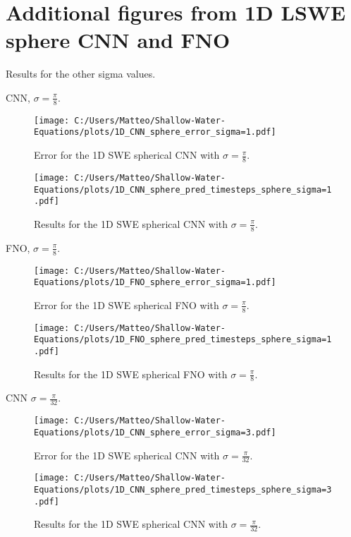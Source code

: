 \section{Additional figures from 1D LSWE sphere CNN and FNO}\label{app:1D_SWE_spherical_CNN_FNO}
Results for the other sigma values.


CNN, $\sigma = \frac{\pi}{8}$.
\begin{figure}[H]
    \centering
    \texttt{[image: C:/Users/Matteo/Shallow-Water-Equations/plots/1D\_CNN\_sphere\_error\_sigma=1.pdf]}
    \caption{Error for the 1D SWE spherical CNN with $\sigma = \frac{\pi}{8}$.}
\end{figure}

\begin{figure}[H]
    \centering
    \texttt{[image: C:/Users/Matteo/Shallow-Water-Equations/plots/1D\_CNN\_sphere\_pred\_timesteps\_sphere\_sigma=1.pdf]}
    \caption{Results for the 1D SWE spherical CNN with $\sigma = \frac{\pi}{8}$.}
\end{figure}

FNO, $\sigma = \frac{\pi}{8}$.
\begin{figure}[H]
    \centering
    \texttt{[image: C:/Users/Matteo/Shallow-Water-Equations/plots/1D\_FNO\_sphere\_error\_sigma=1.pdf]}
    \caption{Error for the 1D SWE spherical FNO with $\sigma = \frac{\pi}{8}$.}
\end{figure}

\begin{figure}[H]
    \centering
    \texttt{[image: C:/Users/Matteo/Shallow-Water-Equations/plots/1D\_FNO\_sphere\_pred\_timesteps\_sphere\_sigma=1.pdf]}
    \caption{Results for the 1D SWE spherical FNO with $\sigma = \frac{\pi}{8}$.}
\end{figure}

CNN $\sigma = \frac{\pi}{32}$.
\begin{figure}[H]
    \centering
    \texttt{[image: C:/Users/Matteo/Shallow-Water-Equations/plots/1D\_CNN\_sphere\_error\_sigma=3.pdf]}
    \caption{Error for the 1D SWE spherical CNN with $\sigma = \frac{\pi}{32}$.}
\end{figure}

\begin{figure}[H]
    \centering
    \texttt{[image: C:/Users/Matteo/Shallow-Water-Equations/plots/1D\_CNN\_sphere\_pred\_timesteps\_sphere\_sigma=3.pdf]}
    \caption{Results for the 1D SWE spherical CNN with $\sigma = \frac{\pi}{32}$.}
\end{figure}


